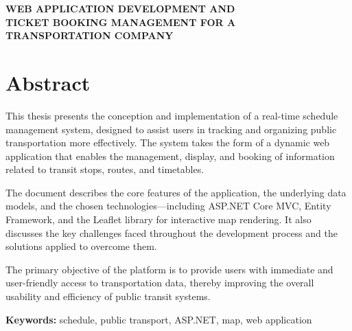 \begin{center}
{\LARGE \textbf{WEB APPLICATION DEVELOPMENT AND}}\\[0.3cm]
{\LARGE \textbf{TICKET BOOKING MANAGEMENT FOR A}}\\[0.3cm]
{\LARGE \textbf{TRANSPORTATION COMPANY}}\\[0.7cm]
\end{center}



\section*{Abstract}

This thesis presents the conception and implementation of a real-time schedule management system, designed to assist users in tracking and organizing public transportation more effectively. The system takes the form of a dynamic web application that enables the management, display, and booking of information related to transit stops, routes, and timetables.

The document describes the core features of the application, the underlying data models, and the chosen technologies—including ASP.NET Core MVC, Entity Framework, and the Leaflet library for interactive map rendering. It also discusses the key challenges faced throughout the development process and the solutions applied to overcome them.

The primary objective of the platform is to provide users with immediate and user-friendly access to transportation data, thereby improving the overall usability and efficiency of public transit systems.


\vspace{1cm}

\noindent\textbf{Keywords:} schedule, public transport, ASP.NET, map, web application
